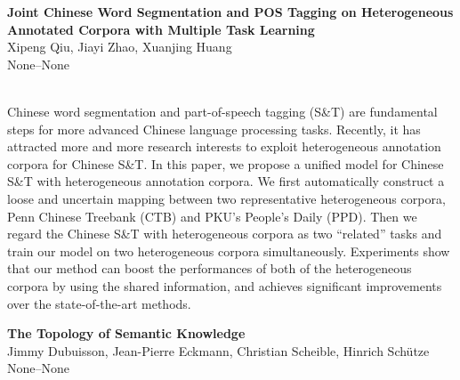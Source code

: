 \documentclass[twoside,makeidx]{book}
\begin{document}
\par\vspace{2em}\noindent%
\begin{minipage}{\linewidth}%
\begin{center}
\textbf{\normalsize Joint Chinese Word Segmentation and POS Tagging on Heterogeneous Annotated Corpora with Multiple Task Learning}\\
\normalsize  Xipeng Qiu,  Jiayi Zhao,  Xuanjing Huang\\
{\small None--None}\\
\end{center}
\end{minipage}\\[0.5em]
\nopagebreak%
\noindent%
{\small Chinese word segmentation and part-of-speech tagging (S\&T) are fundamental steps for more advanced Chinese language processing tasks. Recently, it has attracted more and more research interests to exploit heterogeneous annotation corpora for Chinese S\&T. In this paper, we propose a unified model for Chinese S\&T with heterogeneous annotation corpora. We first automatically construct a loose and uncertain mapping between two representative heterogeneous corpora, Penn Chinese Treebank (CTB) and PKU's People's Daily (PPD). Then we regard the Chinese S\&T with heterogeneous corpora as two ``related'' tasks and train our model on two heterogeneous corpora simultaneously. Experiments show that our method can boost the performances of both of the heterogeneous corpora by using the shared information, and achieves significant improvements over the state-of-the-art methods.}
\par\vspace{2em}\noindent%
\begin{minipage}{\linewidth}%
\begin{center}
\textbf{\normalsize The Topology of Semantic Knowledge}\\
\normalsize  Jimmy Dubuisson,  Jean-Pierre Eckmann,  Christian Scheible,  Hinrich Sch\"{u}tze\\
{\small None--None}\\
\end{center}
\end{minipage}\\[0.5em]
\nopagebreak%
\noindent%
\end{document}
